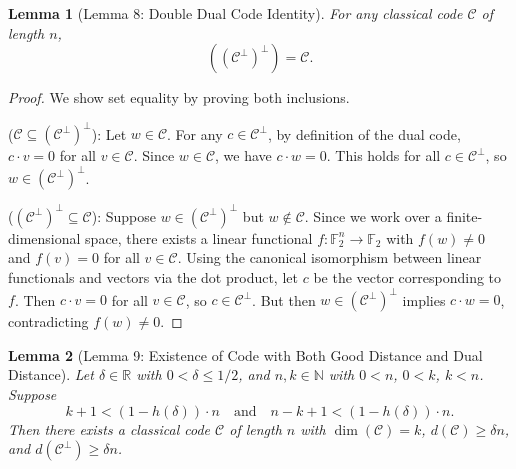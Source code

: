 \documentclass[11pt]{article}
\theoremstyle{plain}
\newtheorem*{lemma}{Lemma}
\theoremstyle{definition}
\theoremstyle{remark}
\begin{document}
\begin{lemma}[Lemma 8: Double Dual Code Identity]
For any classical code $\mathcal{C}$ of length $n$,
\[
((\mathcal{C}^\perp)^\perp) = \mathcal{C}.
\]
\end{lemma}

\begin{proof}
We show set equality by proving both inclusions.

($\mathcal{C} \subseteq (\mathcal{C}^\perp)^\perp$): Let $w \in \mathcal{C}$. For any $c \in \mathcal{C}^\perp$, by definition of the dual code, $c \cdot v = 0$ for all $v \in \mathcal{C}$. Since $w \in \mathcal{C}$, we have $c \cdot w = 0$. This holds for all $c \in \mathcal{C}^\perp$, so $w \in (\mathcal{C}^\perp)^\perp$.

($(\mathcal{C}^\perp)^\perp \subseteq \mathcal{C}$): Suppose $w \in (\mathcal{C}^\perp)^\perp$ but $w \notin \mathcal{C}$. Since we work over a finite-dimensional space, there exists a linear functional $f : \mathbb{F}_2^n \to \mathbb{F}_2$ with $f(w) \neq 0$ and $f(v) = 0$ for all $v \in \mathcal{C}$. Using the canonical isomorphism between linear functionals and vectors via the dot product, let $c$ be the vector corresponding to $f$. Then $c \cdot v = 0$ for all $v \in \mathcal{C}$, so $c \in \mathcal{C}^\perp$. But then $w \in (\mathcal{C}^\perp)^\perp$ implies $c \cdot w = 0$, contradicting $f(w) \neq 0$.
\end{proof}

\begin{lemma}[Lemma 9: Existence of Code with Both Good Distance and Dual Distance]
Let $\delta \in \mathbb{R}$ with $0 < \delta \leq 1/2$, and $n, k \in \mathbb{N}$ with $0 < n$, $0 < k$, $k < n$. Suppose
\[
k + 1 < (1 - h(\delta)) \cdot n \quad \text{and} \quad n - k + 1 < (1 - h(\delta)) \cdot n.
\]
Then there exists a classical code $\mathcal{C}$ of length $n$ with $\dim(\mathcal{C}) = k$, $d(\mathcal{C}) \geq \delta n$, and $d(\mathcal{C}^\perp) \geq \delta n$.
\end{lemma}
\end{document}
